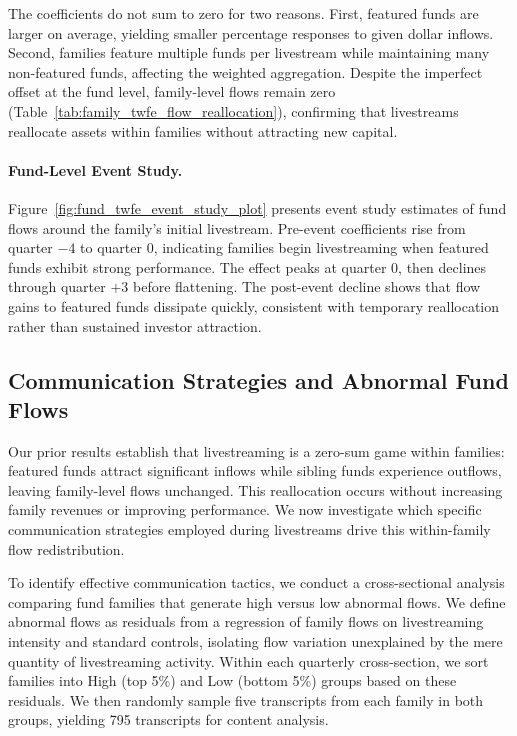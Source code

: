 \documentclass[12pt]{article}
\begin{document}
The coefficients do not sum to zero for two reasons. First, featured funds are larger on average, yielding smaller percentage responses to given dollar inflows. Second, families feature multiple funds per livestream while maintaining many non-featured funds, affecting the weighted aggregation. Despite the imperfect offset at the fund level, family-level flows remain zero (Table~\ref{tab:family_twfe_flow_reallocation}), confirming that livestreams reallocate assets within families without attracting new capital.

\paragraph{Fund-Level Event Study.} Figure~\ref{fig:fund_twfe_event_study_plot} presents event study estimates of fund flows around the family's initial livestream. Pre-event coefficients rise from quarter $-4$ to quarter 0, indicating families begin livestreaming when featured funds exhibit strong performance. The effect peaks at quarter 0, then declines through quarter $+3$ before flattening. The post-event decline shows that flow gains to featured funds dissipate quickly, consistent with temporary reallocation rather than sustained investor attraction.

\subsection{Communication Strategies and Abnormal Fund Flows}\label{subsec:communication_strategies}

Our prior results establish that livestreaming is a zero-sum game within families: featured funds attract significant inflows while sibling funds experience outflows, leaving family-level flows unchanged. This reallocation occurs without increasing family revenues or improving performance. We now investigate which specific communication strategies employed during livestreams drive this within-family flow redistribution.

To identify effective communication tactics, we conduct a cross-sectional analysis comparing fund families that generate high versus low abnormal flows. We define abnormal flows as residuals from a regression of family flows on livestreaming intensity and standard controls, isolating flow variation unexplained by the mere quantity of livestreaming activity. Within each quarterly cross-section, we sort families into High (top 5\%) and Low (bottom 5\%) groups based on these residuals. We then randomly sample five transcripts from each family in both groups, yielding 795 transcripts for content analysis.
\end{document}
